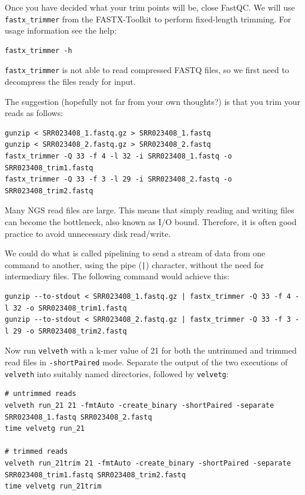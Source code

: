 \begin{steps}
Once you have decided what your trim points will be, close FastQC.
We will use \texttt{fastx\_trimmer} from the FASTX-Toolkit to perform
fixed-length trimming. For usage information see the help:
\begin{lstlisting}
fastx_trimmer -h
\end{lstlisting}

\begin{note}
\texttt{fastx\_trimmer} is not able to read compressed FASTQ files, so we first
need to decompress the files ready for input.
\end{note}

The suggestion (hopefully not far from your own thoughts?) is that you trim your
reads as follows:

\begin{lstlisting}
gunzip < SRR023408_1.fastq.gz > SRR023408_1.fastq
gunzip < SRR023408_2.fastq.gz > SRR023408_2.fastq
fastx_trimmer -Q 33 -f 4 -l 32 -i SRR023408_1.fastq -o SRR023408_trim1.fastq 
fastx_trimmer -Q 33 -f 3 -l 29 -i SRR023408_2.fastq -o SRR023408_trim2.fastq
\end{lstlisting}

\begin{advanced}
Many NGS read files are large. This means that simply reading and writing files
can become the bottleneck, also known as I/O bound. Therefore, it is often good practice to
avoid unnecessary disk read/write.

We could do what is called pipelining to send a stream of data from one command
to another, using the pipe (\texttt{|}) character, without the need for
intermediary files. The following command would achieve this:
\begin{lstlisting}
gunzip --to-stdout < SRR023408_1.fastq.gz | fastx_trimmer -Q 33 -f 4 -l 32 -o SRR023408_trim1.fastq 
gunzip --to-stdout < SRR023408_2.fastq.gz | fastx_trimmer -Q 33 -f 3 -l 29 -o SRR023408_trim2.fastq
\end{lstlisting}
\end{advanced}

Now run \texttt{velveth} with a k-mer value of 21 for both the untrimmed and
trimmed read files in \texttt{-shortPaired} mode. Separate the output of the two
executions of \texttt{velveth} into suitably named directories, followed by
\texttt{velvetg}:
\begin{lstlisting}
# untrimmed reads
velveth run_21 21 -fmtAuto -create_binary -shortPaired -separate SRR023408_1.fastq SRR023408_2.fastq
time velvetg run_21

# trimmed reads
velveth run_21trim 21 -fmtAuto -create_binary -shortPaired -separate SRR023408_trim1.fastq SRR023408_trim2.fastq
time velvetg run_21trim
\end{lstlisting}
\end{steps}

